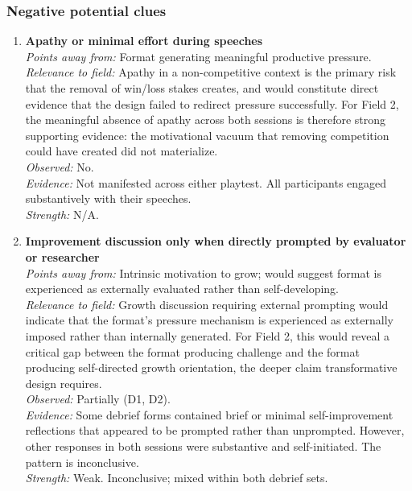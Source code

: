 \subsubsection*{Negative potential clues}

\begin{enumerate}

\item \textbf{Apathy or minimal effort during speeches}\\
\textit{Points away from:} Format generating meaningful productive pressure.\\
\textit{Relevance to field:} Apathy in a non-competitive context is the primary risk that the removal of win/loss stakes creates, and would constitute direct evidence that the design failed to redirect pressure successfully. For Field 2, the meaningful absence of apathy across both sessions is therefore strong supporting evidence: the motivational vacuum that removing competition could have created did not materialize.\\
\textit{Observed:} No.\\
\textit{Evidence:} Not manifested across either playtest. All participants engaged substantively with their speeches.\\
\textit{Strength:} N/A.

\item \textbf{Improvement discussion only when directly prompted by evaluator or researcher}\\
\textit{Points away from:} Intrinsic motivation to grow; would suggest format is experienced as externally evaluated rather than self-developing.\\
\textit{Relevance to field:} Growth discussion requiring external prompting would indicate that the format's pressure mechanism is experienced as externally imposed rather than internally generated. For Field 2, this would reveal a critical gap between the format producing challenge and the format producing self-directed growth orientation, the deeper claim transformative design requires.\\
\textit{Observed:} Partially (D1, D2).\\
\textit{Evidence:} Some debrief forms contained brief or minimal self-improvement reflections that appeared to be prompted rather than unprompted. However, other responses in both sessions were substantive and self-initiated. The pattern is inconclusive.\\
\textit{Strength:} Weak. Inconclusive; mixed within both debrief sets.


\end{enumerate}
